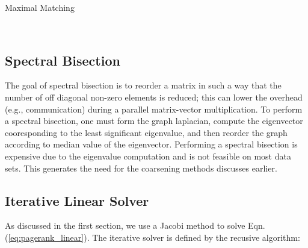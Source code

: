 \documentclass[11pt]{article}
\begin{document}

	\begin{algorithm}[H]
        \small
	\caption{Maximal Matching}\label{alg:mxm}
	\begin{algorithmic}[1]
        \\
        
        \EndParFor

        \EndIf
        \EndParFor

        \EndFor
        
        \EndProcedure
        \end{algorithmic}
        \end{algorithm} 


\subsection{Spectral Bisection}
The goal of spectral bisection is to reorder a matrix in such a way that the number of off diagonal non-zero
elements is reduced; this can lower the overhead (e.g., communication) during a parallel
matrix-vector multiplication. To perform a spectral bisection, one must form the
graph laplacian, compute the eigenvector cooresponding to the least significant
eigenvalue, and then reorder the graph according to median value of the
eigenvector. Performing a spectral bisection is expensive due to the eigenvalue
computation and is not feasible on most data sets. This generates the need for
the coarsening methods discusses earlier. 


\subsection{Iterative Linear Solver}

As discussed in the first section, we use a Jacobi method to solve Eqn.
(\ref{eq:pagerank_linear}). The iterative solver is defined by the recusive
algorithm:
\end{document}
